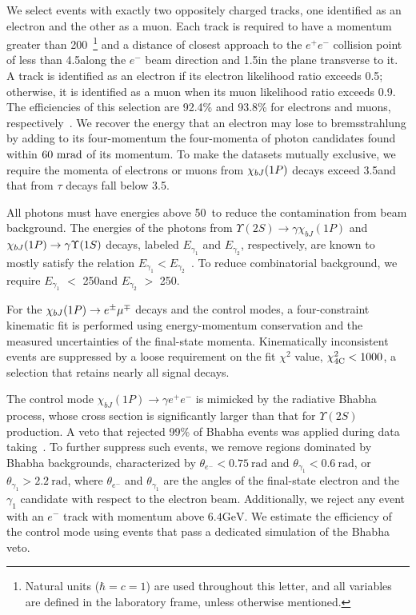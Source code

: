 \documentclass[aps,prl,twocolumn,superscriptaddress,showpacs,preprintnumbers,amsmath,amssymb, nofootinbib]{revtex4-2}
\begin{document}
We select events with exactly two oppositely charged tracks, one identified as an electron and the other as a muon.
Each track is required to have a momentum greater than 200\mev~\footnote{Natural units ($\hbar=c=1$) are used throughout this letter, and all variables are defined in the laboratory frame, unless otherwise mentioned.}
and a distance of closest approach to the $e^+e^-$ collision point of less than 4.5\cm along the $e^-$ beam direction and 1.5\cm in the plane transverse to it.
A track is identified as an electron if its electron likelihood ratio exceeds 0.5; otherwise, it is identified as a muon when its muon likelihood ratio exceeds 0.9.
The efficiencies of this selection are 92.4\% and 93.8\% for electrons and muons, respectively~\cite{Hanagaki:2001fz,Abashian:2002bd}.
We recover the energy that an electron may lose to bremsstrahlung by adding to its four-momentum the four-momenta of photon candidates found within $60~{\rm{mrad}}$ of its momentum.
To make the datasets mutually exclusive, we require the momenta of electrons or muons from $\chi_{bJ}(1P)$ decays exceed 3.5\gev and that from $\tau$ decays fall below 3.5\gev.

All photons must have energies above 50\mev\ to reduce the contamination from beam background.
The energies of the photons from $\Upsilon(2S)\to\gamma\chi_{bJ}(1P)$ and $\chi_{bJ}(1P)\rightarrow\gamma\Upsilon(1S)$ decays, labeled $E_{{\gamma}_1}$ and $E_{{\gamma}_2}$, respectively,
are known to mostly satisfy the relation $E_{{\gamma}_1} <  E_{{\gamma}_2}$~\cite{CLEO:2010xuh, BaBar:2014och}.
To reduce combinatorial background, we require $E_{{\gamma}_1}$ $<$ 250\mev and $E_{{\gamma}_2}$ $>$ 250\mev.

For the $\chi_{bJ}(1P)\to e^\pm\mu^\mp$ decays and the control modes, a four-constraint kinematic fit is performed
using energy-momentum conservation and the measured uncertainties of the final-state momenta.
Kinematically inconsistent events are suppressed by a loose requirement on the fit $\chi^2$ value, $\chi^2_{\rm 4C} < 1000$, a selection that retains nearly all signal decays.

The control mode $\chi_{bJ}(1P)\to\gamma e^+e^-$ is mimicked by the radiative Bhabha process,
whose cross section is significantly larger than that for $\Upsilon(2S)$ production.
A veto that rejected 99\% of Bhabha events was applied during data taking~\cite{CHEON2002548}.
To further suppress such events, we remove regions dominated by Bhabha backgrounds,
characterized by $\theta_{e^-}<0.75~\mathrm{rad}$ and $\theta_{\gamma_1}<0.6~\mathrm{rad}$, or $\theta_{\gamma_1}>2.2~\mathrm{rad}$,
where $\theta_{e^-}$ and $\theta_{\gamma_1}$ are the angles of the final-state electron and the $\gamma_1$ candidate with respect to the electron beam.
Additionally, we reject any event with an $e^-$ track with momentum above $6.4\mathrm{GeV}$.
We estimate the efficiency of the control mode using events that pass a dedicated simulation of the Bhabha veto.
\end{document}
